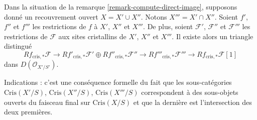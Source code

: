 \begin{remark}
\label{remark-mayer-vietoris}
Dans la situation de la remarque \ref{remark-compute-direct-image},
supposons donné un recouvrement ouvert $X = X' \cup X''$. Notons
$X''' = X' \cap X''$. Soient $f'$, $f''$ et $f'''$ les restrictions de $f$
à $X'$, $X''$ et $X'''$. De plus, soient $\mathcal{F}'$, $\mathcal{F}''$
et $\mathcal{F}'''$ les restrictions de $\mathcal{F}$ aux sites cristallins
de $X'$, $X''$ et $X'''$. Il existe alors un triangle distingué
$$
Rf_{\text{cris}, *}\mathcal{F}
\longrightarrow
Rf'_{\text{cris}, *}\mathcal{F}' \oplus Rf''_{\text{cris}, *}\mathcal{F}''
\longrightarrow
Rf'''_{\text{cris}, *}\mathcal{F}'''
\longrightarrow
Rf_{\text{cris}, *}\mathcal{F}[1]
$$
dans $D(\mathcal{O}_{X'/S'})$.

\medskip\noindent
Indications : c'est une conséquence formelle du fait que les sous-catégories
$\text{Cris}(X'/S)$, $\text{Cris}(X''/S)$, $\text{Cris}(X'''/S)$ correspondent
à des sous-objets ouverts du faisceau final sur $\text{Cris}(X/S)$ et que la
dernière est l'intersection des deux premières.
\end{remark}

